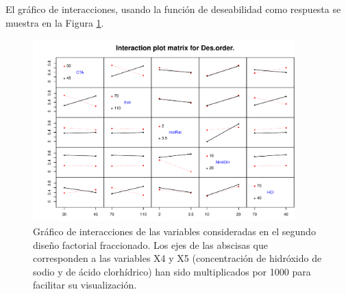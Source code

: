 El gráfico de interacciones, usando la función de deseabilidad como respuesta se muestra en la Figura \ref{fig:IAPLOTFrF2-2}.  

\begin{figure}[H]
    \centering
    \includegraphics[width=0.9\textwidth, trim={1cm 0.3cm 0 1cm}, clip]{chap5/figures/IAPlotFrF2-2.pdf}
    \caption[Gráfico de interacciones del segundo diseño factorial fraccionado.]{Gráfico de interacciones de las variables consideradas en el segundo diseño factorial fraccionado. Los ejes de las abscisas que corresponden a las variables X4 y X5 (concentración de hidróxido de sodio y de ácido clorhídrico) han sido multiplicados por 1000 para facilitar su visualización.}
    \label{fig:IAPLOTFrF2-2}
\end{figure}

